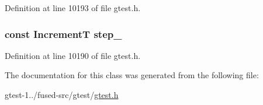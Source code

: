 \-Definition at line 10193 of file gtest.\-h.

\hypertarget{classtesting_1_1internal_1_1RangeGenerator_ab1ed3e7cdff8cb7dd4d077c865a66c1a}{
\subsubsection[{step\-\_\-}]{\setlength{\rightskip}{0pt plus 5cm}const \-Increment\-T {\bf step\-\_\-}}}\label{d0/d50/classtesting_1_1internal_1_1RangeGenerator_ab1ed3e7cdff8cb7dd4d077c865a66c1a}


\-Definition at line 10190 of file gtest.\-h.



\-The documentation for this class was generated from the following file\-:\begin{DoxyCompactItemize}
\item 
gtest-\/1../fused-\/src/gtest/\hyperlink{fused-src_2gtest_2gtest_8h}{gtest.\-h}\end{DoxyCompactItemize}
